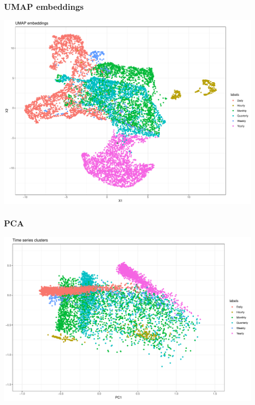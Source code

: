 \begin{frame}
\frametitle{UMAP embeddings}

\begin{center}
\includegraphics[width = \linewidth]{slides/umap.pdf}
\end{center}
\end{frame}


\begin{frame}
\frametitle{PCA}

\begin{center}
\includegraphics[width = \linewidth]{slides/pca.pdf}
\end{center}
\end{frame}



